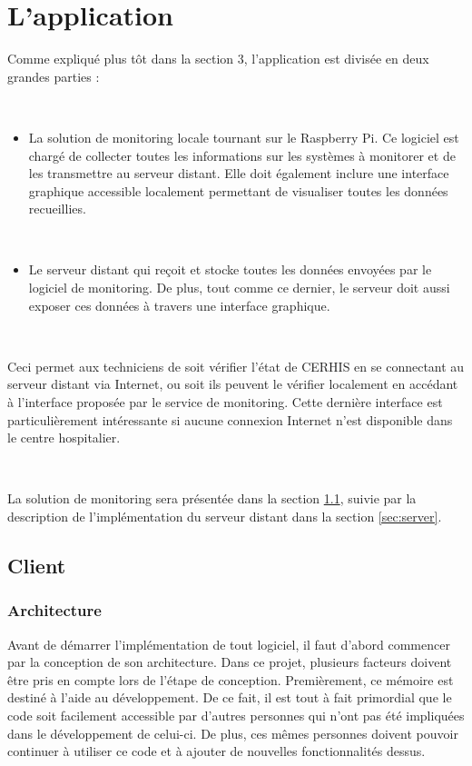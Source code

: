 \chapter{L'application}
\label{sec:archi}


\noindent
Comme expliqué plus tôt dans la section 3, l'application est divisée en deux grandes parties :

~

\begin{itemize}
  \item La solution de monitoring locale tournant sur le Raspberry Pi. Ce logiciel est chargé de collecter toutes les informations sur les systèmes à monitorer et de les transmettre au serveur distant. Elle doit également inclure une interface graphique accessible localement permettant de visualiser toutes les données recueillies.

  ~

  \item Le serveur distant qui reçoit et stocke toutes les données envoyées par le logiciel de monitoring. De plus, tout comme ce dernier, le serveur doit aussi exposer ces données à travers une interface graphique.
\end{itemize}

~

\noindent
Ceci permet aux techniciens de soit vérifier l'état de CERHIS en se connectant au serveur distant via Internet, ou soit ils peuvent le vérifier localement en accédant à l'interface proposée par le service de monitoring. Cette dernière interface est particulièrement intéressante si aucune connexion Internet n'est disponible dans le centre hospitalier.

~

\noindent
La solution de monitoring sera présentée dans la section \ref{sec:client}, suivie par la description de l'implémentation du serveur distant dans la section \ref{sec:server}.




\section{Client}
\label{sec:client}

\subsection{Architecture}
\label{sec:c_arch}

\noindent
Avant de démarrer l'implémentation de tout logiciel, il faut d'abord commencer par la conception de son architecture.  Dans ce projet, plusieurs facteurs doivent être pris en compte lors de l'étape de conception. Premièrement, ce mémoire est destiné à l'aide au développement. De ce fait, il est tout à fait primordial que le code soit facilement accessible par d'autres personnes qui n'ont pas été impliquées dans le développement de celui-ci. De plus, ces mêmes personnes doivent pouvoir continuer à utiliser ce code et à ajouter de nouvelles fonctionnalités dessus.

